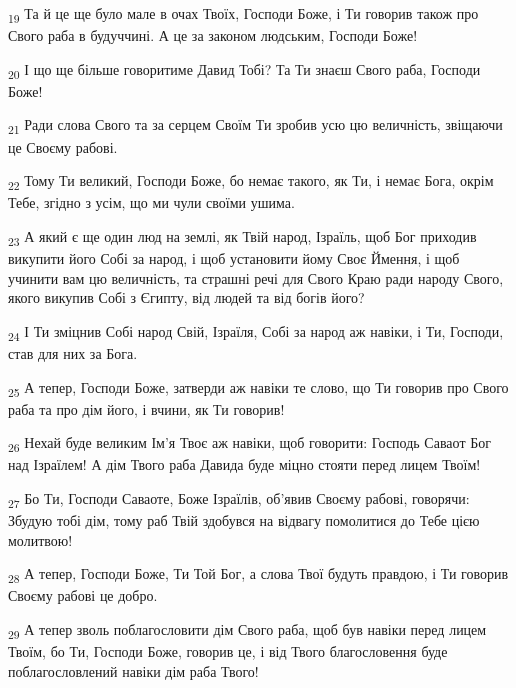 \begin{tcolorbox}
\textsubscript{19} Та й це ще було мале в очах Твоїх, Господи Боже, і Ти говорив також про Свого раба в будуччині. А це за законом людським, Господи Боже!
\end{tcolorbox}
\begin{tcolorbox}
\textsubscript{20} І що ще більше говоритиме Давид Тобі? Та Ти знаєш Свого раба, Господи Боже!
\end{tcolorbox}
\begin{tcolorbox}
\textsubscript{21} Ради слова Свого та за серцем Своїм Ти зробив усю цю величність, звіщаючи це Своєму рабові.
\end{tcolorbox}
\begin{tcolorbox}
\textsubscript{22} Тому Ти великий, Господи Боже, бо немає такого, як Ти, і немає Бога, окрім Тебе, згідно з усім, що ми чули своїми ушима.
\end{tcolorbox}
\begin{tcolorbox}
\textsubscript{23} А який є ще один люд на землі, як Твій народ, Ізраїль, щоб Бог приходив викупити його Собі за народ, і щоб установити йому Своє Ймення, і щоб учинити вам цю величність, та страшні речі для Свого Краю ради народу Свого, якого викупив Собі з Єгипту, від людей та від богів його?
\end{tcolorbox}
\begin{tcolorbox}
\textsubscript{24} І Ти зміцнив Собі народ Свій, Ізраїля, Собі за народ аж навіки, і Ти, Господи, став для них за Бога.
\end{tcolorbox}
\begin{tcolorbox}
\textsubscript{25} А тепер, Господи Боже, затверди аж навіки те слово, що Ти говорив про Свого раба та про дім його, і вчини, як Ти говорив!
\end{tcolorbox}
\begin{tcolorbox}
\textsubscript{26} Нехай буде великим Ім'я Твоє аж навіки, щоб говорити: Господь Саваот Бог над Ізраїлем! А дім Твого раба Давида буде міцно стояти перед лицем Твоїм!
\end{tcolorbox}
\begin{tcolorbox}
\textsubscript{27} Бо Ти, Господи Саваоте, Боже Ізраїлів, об'явив Своєму рабові, говорячи: Збудую тобі дім, тому раб Твій здобувся на відвагу помолитися до Тебе цією молитвою!
\end{tcolorbox}
\begin{tcolorbox}
\textsubscript{28} А тепер, Господи Боже, Ти Той Бог, а слова Твої будуть правдою, і Ти говорив Своєму рабові це добро.
\end{tcolorbox}
\begin{tcolorbox}
\textsubscript{29} А тепер зволь поблагословити дім Свого раба, щоб був навіки перед лицем Твоїм, бо Ти, Господи Боже, говорив це, і від Твого благословення буде поблагословлений навіки дім раба Твого!
\end{tcolorbox}
